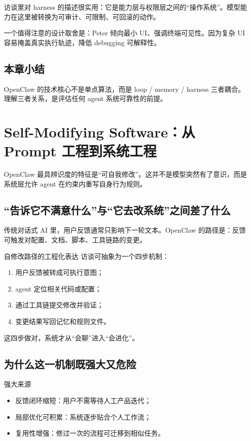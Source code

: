 \documentclass[a4paper]{article}
\begin{document}
访谈里对 harness 的描述很实用：它是能力层与权限层之间的“操作系统”。模型能力在这里被转换为可审计、可限制、可回滚的动作。

一个值得注意的设计取舍是：Peter 倾向最小 UI、强调终端可见性。因为复杂 UI 容易掩盖真实执行轨迹，降低 debugging 可解释性。

\subsection{本章小结}
OpenClaw 的技术核心不是单点算法，而是 loop / memory / harness 三者耦合。理解三者关系，是评估任何 agent 系统可靠性的前提。

\section{Self-Modifying Software：从 Prompt 工程到系统工程}

OpenClaw 最具辨识度的特征是“可自我修改”。这并不是模型突然有了意识，而是系统层允许 agent 在约束内重写自身行为规则。

\subsection{“告诉它不满意什么”与“它去改系统”之间差了什么}

传统对话式 AI 里，用户反馈通常只影响下一轮文本。OpenClaw 的路径是：反馈可触发对配置、文档、脚本、工具链路的变更。

\begin{importantbox}{自修改路径的工程化表达}
访谈可抽象为一个四步机制：
\begin{enumerate}
    \item 用户反馈被转成可执行意图；
    \item agent 定位相关代码或配置；
    \item 通过工具链提交修改并验证；
    \item 变更结果写回记忆和规则文件。
\end{enumerate}
这四步做对，系统才从“会聊”进入“会进化”。
\end{importantbox}

\subsection{为什么这一机制既强大又危险}

\begin{knowledgebox}{强大来源}
\begin{itemize}
    \item 反馈闭环缩短：用户不需等待人工产品迭代；
    \item 局部优化可积累：系统逐步贴合个人工作流；
    \item 复用性增强：修过一次的流程可迁移到相似任务。
\end{itemize}
\end{knowledgebox}
\end{document}
